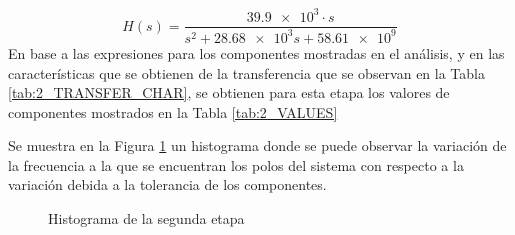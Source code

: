 \begin{equation}
    H(s) = \frac{\num{39.9e3}\cdot s}{s^2 + \num{28.68e3}s + \num{58.61e9}}
    \label{eq:1_TRANFER}
\end{equation}
En base a las expresiones para los componentes mostradas en el an\'alisis, y en las caracter\'isticas que se obtienen de la transferencia que se observan en la Tabla \ref{tab:2_TRANSFER_CHAR}, se obtienen para esta etapa los valores de componentes mostrados en la Tabla \ref{tab:2_VALUES}
\begin{table}[H]
    \centering
    \caption{Caracter\'isticas de la segunda etapa}
    \label{tab:2_TRANSFER_CHAR}
\end{table}
\begin{table}[H]
    \centering
    \caption{Valores de componentes para la segunda etapa}
    \label{tab:2_VALUES}
\end{table}
Se muestra en la Figura \ref{fig:2_HIST} un histograma donde se puede observar la variaci\'on de la frecuencia a la que se encuentran los polos del sistema con respecto a la variaci\'on debida a la tolerancia de los componentes.
\begin{figure}[H]
    \centering
    \caption{Histograma de la segunda etapa}
    \label{fig:2_HIST}
\end{figure}


